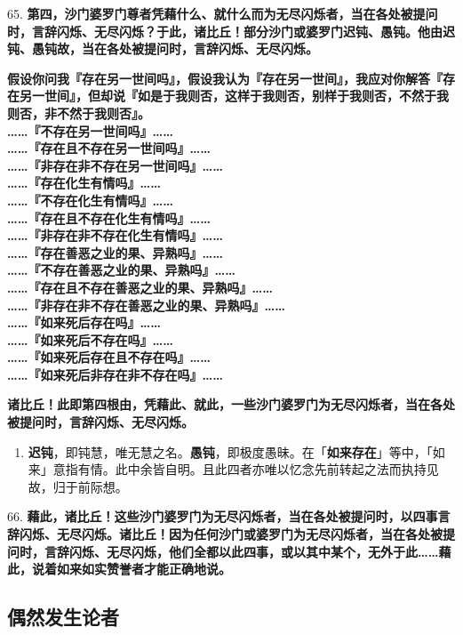 {\Large 65.} \textbf{第四，沙门婆罗门尊者凭藉什么、就什么而为无尽闪烁者，当在各处被提问时，言辞闪烁、无尽闪烁？于此，诸比丘！部分沙门或婆罗门迟钝、愚钝。他由迟钝、愚钝故，当在各处被提问时，言辞闪烁、无尽闪烁。}

\textbf{假设你问我『存在另一世间吗』，假设我认为『存在另一世间』，我应对你解答『存在另一世间』，但却说『如是于我则否，这样于我则否，别样于我则否，不然于我则否，非不然于我则否』。}\\
\textbf{……『不存在另一世间吗』……}\\
\textbf{……『存在且不存在另一世间吗』……}\\
\textbf{……『非存在非不存在另一世间吗』……}\\
\textbf{……『存在化生有情吗』……}\\
\textbf{……『不存在化生有情吗』……}\\
\textbf{……『存在且不存在化生有情吗』……}\\
\textbf{……『非存在非不存在化生有情吗』……}\\
\textbf{……『存在善恶之业的果、异熟吗』……}\\
\textbf{……『不存在善恶之业的果、异熟吗』……}\\
\textbf{……『存在且不存在善恶之业的果、异熟吗』……}\\
\textbf{……『非存在非不存在善恶之业的果、异熟吗』……}\\
\textbf{……『如来死后存在吗』……}\\
\textbf{……『如来死后不存在吗』……}\\
\textbf{……『如来死后存在且不存在吗』……}\\
\textbf{……『如来死后非存在非不存在吗』……}

\textbf{诸比丘！此即第四根由，凭藉此、就此，一些沙门婆罗门为无尽闪烁者，当在各处被提问时，言辞闪烁、无尽闪烁。}

\begin{enumerate}\item \textbf{迟钝}，即钝慧，唯无慧之名。\textbf{愚钝}，即极度愚昧。在「\textbf{如来存在}」等中，「如来」意指有情。此中余皆自明。且此四者亦唯以忆念先前转起之法而执持见故，归于前际想。\end{enumerate}

{\Large 66.} \textbf{藉此，诸比丘！这些沙门婆罗门为无尽闪烁者，当在各处被提问时，以四事言辞闪烁、无尽闪烁。诸比丘！因为任何沙门或婆罗门为无尽闪烁者，当在各处被提问时，言辞闪烁、无尽闪烁，他们全都以此四事，或以其中某个，无外于此……藉此，说着如来如实赞誉者才能正确地说。}

\subsection{偶然发生论者}


